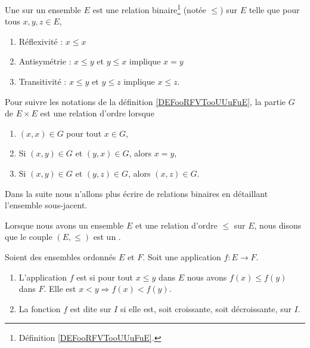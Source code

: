 \begin{definition}      \label{DefooFLYOooRaGYRk}
	Une  sur un ensemble \( E\) est une relation binaire\footnote{Définition \ref{DEFooRFVTooUUuFuE}.} (notée \( \leq\)) sur \( E\) telle que pour tous \( x,y,z\in E\),
	\begin{enumerate}
		\item
		      Réflexivité : \( x\leq x\)
		\item \label{ITEMooQTXOooTZXEnu}
		      Antisymétrie : \( x\leq y\) et \( y\leq x\) implique \( x=y\)
		\item
		      Transitivité : \( x\leq y\) et \( y\leq z\) implique \( x\leq z\).
	\end{enumerate}

	Pour suivre les notations de la définition \ref{DEFooRFVTooUUuFuE}, la partie \( G\) de \( E\times E\) est une relation d'ordre lorsque
	\begin{enumerate}
		\item
		      \( (x,x)\in G\) pour tout \( x\in G\),
		\item
		      Si \( (x,y)\in G\) et \( (y,x)\in G\), alors \( x=y\),
		\item
		      Si \( (x,y)\in G\) et \( (y,z)\in G\), alors \( (x,z)\in G\).
	\end{enumerate}
	Dans la suite nous n'allons plus écrire de relations binaires en détaillant l'ensemble sous-jacent.

	Lorsque nous avons un ensemble \( E\) et une relation d'ordre \( \leq\) sur \( E\), nous disons que le couple \( (E,\leq)\) est un .
\end{definition}

\begin{definition}		\label{DEFooFTZAooLrtNEo}
	Soient des ensembles ordonnés \( E\) et \( F\). Soit une application \(f \colon E\to F  \).
	\begin{enumerate}
		\item
		      L'application \( f\) est  si pour tout \( x\leq y\) dans \( E\) nous avons \( f(x)\leq f(y)\) dans \( F\). Elle est  \( x<y\Rightarrow f(x)<f(y)\).
		\item
		      La fonction \( f\) est dite  sur \( I\) si elle est, soit croissante, soit décroissante, sur \( I\).
	\end{enumerate}
\end{definition}

